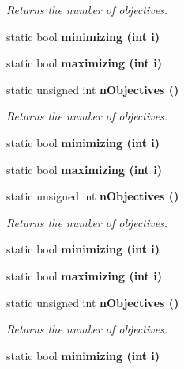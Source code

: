 \begin{CompactItemize}
\begin{CompactList}\small\item\em Returns the number of objectives. \item\end{CompactList}\item 
static bool \bf{minimizing} (int i)\label{classObjectiveVectorTraits_52dc1c3dd95f37fe256708f40189a6fd}

\item 
static bool \bf{maximizing} (int i)\label{classObjectiveVectorTraits_69ddc04a4bf7b842f5457f7cff09c479}

\item 
static unsigned int \bf{n\-Objectives} ()\label{classObjectiveVectorTraits_8f8cb44cfe76117ab1c5624e4fced91f}

\begin{CompactList}\small\item\em Returns the number of objectives. \item\end{CompactList}\item 
static bool \bf{minimizing} (int i)\label{classObjectiveVectorTraits_52dc1c3dd95f37fe256708f40189a6fd}

\item 
static bool \bf{maximizing} (int i)\label{classObjectiveVectorTraits_69ddc04a4bf7b842f5457f7cff09c479}

\item 
static unsigned int \bf{n\-Objectives} ()\label{classObjectiveVectorTraits_8f8cb44cfe76117ab1c5624e4fced91f}

\begin{CompactList}\small\item\em Returns the number of objectives. \item\end{CompactList}\item 
static bool \bf{minimizing} (int i)\label{classObjectiveVectorTraits_52dc1c3dd95f37fe256708f40189a6fd}

\item 
static bool \bf{maximizing} (int i)\label{classObjectiveVectorTraits_69ddc04a4bf7b842f5457f7cff09c479}

\item 
static unsigned int \bf{n\-Objectives} ()\label{classObjectiveVectorTraits_8f8cb44cfe76117ab1c5624e4fced91f}

\begin{CompactList}\small\item\em Returns the number of objectives. \item\end{CompactList}\item 
static bool \bf{minimizing} (int i)\label{classObjectiveVectorTraits_52dc1c3dd95f37fe256708f40189a6fd}


\end{CompactItemize}

